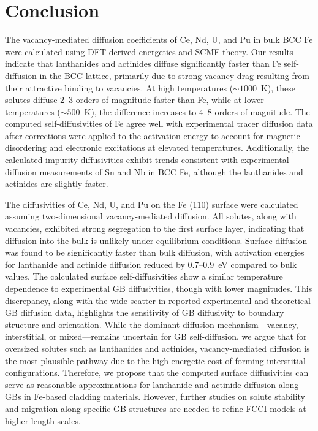 \documentclass[preprint,12pt]{elsarticle}
\begin{document}
\FloatBarrier

\section{Conclusion}
\noindent The vacancy-mediated diffusion coefficients of Ce, Nd, U, and Pu in bulk BCC Fe were calculated using DFT-derived energetics and SCMF theory. Our results indicate that lanthanides and actinides diffuse significantly faster than Fe self-diffusion in the BCC lattice, primarily due to strong vacancy drag resulting from their attractive binding to vacancies. At high temperatures ($\sim1000$~K), these solutes diffuse 2–3 orders of magnitude faster than Fe, while at lower temperatures ($\sim500$~K), the difference increases to 4–8 orders of magnitude.
The computed self-diffusivities of Fe agree well with experimental tracer diffusion data after corrections were applied to the activation energy to account for magnetic disordering and electronic excitations at elevated temperatures. Additionally, the calculated impurity diffusivities exhibit trends consistent with experimental diffusion measurements of Sn and Nb in BCC Fe, although the lanthanides and actinides are slightly faster.

The diffusivities of Ce, Nd, U, and Pu on the Fe (110) surface were calculated assuming two-dimensional vacancy-mediated diffusion. All solutes, along with vacancies, exhibited strong segregation to the first surface layer, indicating that diffusion into the bulk is unlikely under equilibrium conditions. 
Surface diffusion was found to be significantly faster than bulk diffusion, with activation energies for lanthanide and actinide diffusion reduced by 0.7–0.9~eV compared to bulk values. The calculated surface self-diffusivities show a similar temperature dependence to experimental GB diffusivities, though with lower magnitudes. This discrepancy, along with the wide scatter in reported experimental and theoretical GB diffusion data, highlights the sensitivity of GB diffusivity to boundary structure and orientation. 
While the dominant diffusion mechanism—vacancy, interstitial, or mixed—remains uncertain for GB self-diffusion, we argue that for oversized solutes such as lanthanides and actinides, vacancy-mediated diffusion is the most plausible pathway due to the high energetic cost of forming interstitial configurations. 
Therefore, we propose that the computed surface diffusivities can serve as reasonable approximations for lanthanide and actinide diffusion along GBs in Fe-based cladding materials. However, further studies on solute stability and migration along specific GB structures are needed to refine FCCI models at higher-length scales.
\end{document}
